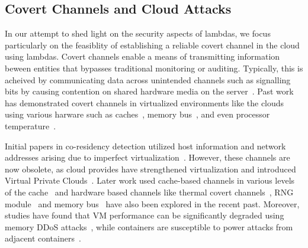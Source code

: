 

\subsection{Covert Channels and Cloud Attacks}
\label{sec:background:covertchannels}
In our attempt to shed light on the security aspects of lambdas, we focus
particularly on the feasiblity of establishing a reliable covert channel in the
cloud using lambdas.  Covert channels enable a means of transmitting information
beween entities that bypasses traditional monitoring or auditing. Typically,
this is acheived by communicating data across unintended channels such as
signalling bits by causing contention on shared hardware media on the
server~\cite{L2cacheCovertChannels,
ProcessorCovertChannels,ThermalCovertChannel,SshOverCovertChannel,wuusenix2012}.
Past work has demonstrated covert channels in virtualized environments like the
clouds using various harware such as
caches~\cite{ristenpartccs2009,L2cacheCovertChannels}, memory
bus~\cite{wuusenix2012}, and even processor
temperature~\cite{ThermalCovertChannel}. 

Initial papers in co-residency detection utilized host information and network
addresses arising due to imperfect virtualization~\cite{ristenpartccs2009}.
However, these channels are now obsolete, as cloud provides have strengthened
virtualization and introduced Virtual Private Clouds~\cite{awsvpc}. Later work
used cache-based channels in various levels of the cache~\cite{xuccsw2011,
zhangccs2014, liu2015, kaylaap2016} and hardware based channels like thermal
covert channels~\cite{mastiusenix2015}, RNG module~\cite{evtyushkinccs2016} and
memory bus~\cite{wuusenix2012} have also been explored in the recent past.
Moreover, studies have found that VM performance can be significantly degraded
using memory DDoS attacks~\cite{zhang2016memory}, while containers are
susceptible to power attacks from adjacent containers~\cite{gao2017}.  


